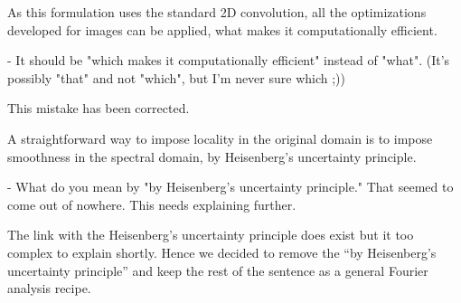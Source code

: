 \documentclass[12pt,a4paper]{article}
\newcommand{\nati}[1]{{\color[rgb]{.1,.6,.1}{NP: #1}}}
\newcommand{\todo}[1]{{\color[rgb]{.6,.1,.6}{TODO: #1}}}
\newcommand{\1}{\b{1}}              %
\newcommand{\0}{\b{0}}              %
\begin{document}
\begin{mdframed}[style=comment]
As this formulation uses the standard 2D convolution, all the optimizations developed for images can be applied, what makes it computationally efficient.

- It should be "which makes it computationally efficient" instead of "what". (It's possibly "that" and not "which", but I'm never sure which ;))
\end{mdframed}
This mistake has been corrected.

\begin{mdframed}[style=comment]
A straightforward way to impose locality in the original domain is to impose smoothness in the spectral domain, by Heisenberg’s uncertainty principle.

- What do you mean by "by Heisenberg’s uncertainty principle." That seemed to come out of nowhere. This needs explaining further.
\end{mdframed}
\todo{To check: @all}

The link with the Heisenberg's uncertainty principle does exist but it too complex to explain shortly. Hence we decided to remove the ``by Heisenberg’s uncertainty principle'' and keep the rest of the sentence as a general Fourier analysis recipe.


\end{document}
